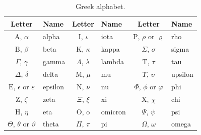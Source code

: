 \begin{table}[hbt]
    \centering
    \caption{Greek alphabet.\vspace{2pt}}
    \label{tab:mathsym}
    \begin{tabular}{@{}clclcl@{}}
        \toprule
        Letter &
        Name &
        Letter &
        Name &
        Letter &
        Name \\
        \midrule
        $\mathrm{A}$, $\alpha$     & alpha &
        $\mathrm{I}$, $\iota$      & iota  &
        $\mathrm{P}$, $\rho$ or $\varrho$ & rho \\

        $\mathrm{B}$, $\beta$      & beta  &
        $\mathrm{K}$, $\kappa$     & kappa &
        $\Sigma$, $\sigma$     & sigma \\

        $\Gamma$, $\gamma$      & gamma &
        $\Lambda$, $\lambda$    & lambda &
        $\mathrm{T}$, $\tau$       & tau \\

        $\Delta$, $\delta$      & delta &
        $\mathrm{M}$, $\mu$        & mu &
        $\Upsilon$, $\upsilon$  & upsilon \\

        $\mathrm{E}$, $\epsilon$ or $\varepsilon$ & epsilon &
        $\mathrm{N}$, $\nu$        & nu &
        $\Phi$, $\phi$ or $\varphi$ & phi \\

        $\mathrm{Z}$, $\zeta$      & zeta  &
        $\Xi$, $\xi$            & xi &
        $\mathrm{X}$, $\chi$       & chi \\

        $\mathrm{H}$, $\eta$       & eta   &
        $\mathrm{O}$, $\mathrm{o}$    & omicron &
        $\Psi$, $\psi$          & psi \\

        $\Theta$, $\theta$ or $\vartheta$ & theta &
        $\Pi$, $\pi$            & pi &
        $\Omega$, $\omega$      & omega \\
        \bottomrule
    \end{tabular}
\end{table}

